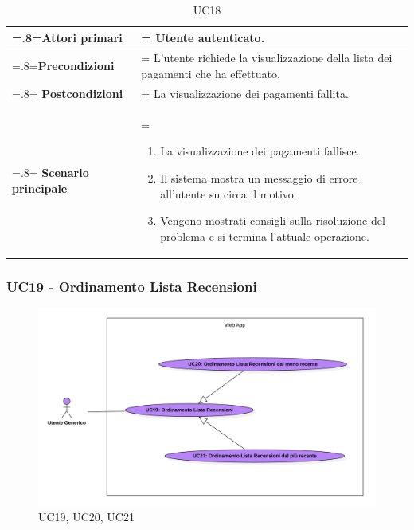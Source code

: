             \begin{table}[H]
                \centering
                \renewcommand{\arraystretch}{1.8}
                \renewcommand\tabularxcolumn[1]{m{#1}}
                \begin{tabularx}{0.9\textwidth} {
                    >{\hsize=.8\hsize\linewidth=\hsize}X
                    >{\hsize=1.2\hsize\linewidth=\hsize}X}
                    \hline
                    \textbf{Attori primari} & Utente autenticato. \\
                    \hline
                    \textbf{Precondizioni} & L'utente richiede la visualizzazione della lista dei pagamenti che ha effettuato. \\
                    \hline
                    \textbf{Postcondizioni} & La visualizzazione dei pagamenti fallita. \\
                    \hline
                    \textbf{Scenario principale} & 
                    \begin{enumerate}
                        \item La visualizzazione dei pagamenti fallisce.
                        \item Il sistema mostra un messaggio di errore all'utente su circa il motivo.
                        \item Vengono mostrati consigli sulla risoluzione del problema e si termina l'attuale operazione.
                    \end{enumerate} \\
                    \hline
                \end{tabularx}
                \caption{UC18}
            \end{table}

            \subsubsection{UC19 - Ordinamento Lista Recensioni}
            \label{UC19}

            \begin{figure}[H]
                \centering
                \includegraphics[scale=0.4]{src/img/UC19.png}
                \caption{UC19, UC20, UC21}
            \end{figure}

